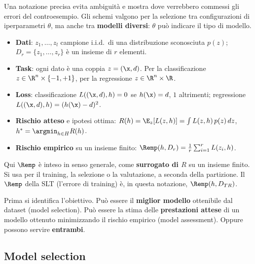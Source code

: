 Una notazione precisa evita ambiguità e mostra dove verrebbero commessi gli errori del controesempio. Gli schemi
valgono per la selezione tra configurazioni di iperparametri $\theta$, ma anche tra \textbf{modelli diversi}:
$\theta$ può indicare il tipo di modello.

\begin{definizione}[Notazione]
\begin{itemize}
  \item \textbf{Dati}: $z_1,\dots,z_l$ campione i.i.d.\ di una distribuzione sconosciuta $p(z)$;
        $D_r = \{z_1,\dots,z_r\}$ è un insieme di $r$ elementi.
  \item \textbf{Task}: ogni dato è una coppia $z = (\x,d)$. Per la classificazione $z\in\R^n\times\{-1,+1\}$, per
        la regressione $z\in\R^n\times\R$.
  \item \textbf{Loss}: classificazione $L((\x,d),h) = 0$ se $h(\x)=d$, $1$ altrimenti; regressione
        $L((\x,d),h) = (h(\x)-d)^2$.
  \item \textbf{Rischio atteso} e ipotesi ottima:
        $R(h) = \E_z[L(z,h)] = \int L(z,h)\,p(z)\,dz$, \quad $h^* = \argmin_{h\in H}R(h)$.
  \item \textbf{Rischio empirico} su un insieme finito: $\Remp(h,D_r) = \frac1r\sum_{i=1}^{r}L(z_i,h)$.
\end{itemize}
\end{definizione}

\begin{attenzione}
Qui $\Remp$ è inteso in senso generale, come \textbf{surrogato di $R$} su un insieme finito. Si usa per il
training, la selezione o la valutazione, a seconda della partizione. Il $\Remp$ della SLT (l'errore di training)
è, in questa notazione, $\Remp(h,D_{TR})$.
\end{attenzione}

Prima si identifica l'obiettivo. Può essere il \textbf{miglior modello} ottenibile dal dataset (model
selection). Può essere la stima delle \textbf{prestazioni attese} di un modello ottenuto minimizzando il rischio
empirico (model assessment). Oppure possono servire \textbf{entrambi}.

\subsection{Model selection}

